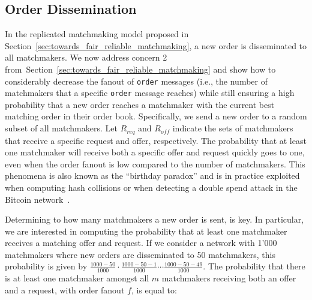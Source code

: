 
\subsection{Order Dissemination}
\label{sec:order_dissemination}
In the replicated matchmaking model proposed in Section~\ref{sec:towards_fair_reliable_matchmaking}, a new order is disseminated to all matchmakers.
We now address concern 2 from~Section~\ref{sec:towards_fair_reliable_matchmaking} and show how to considerably decrease the fanout of \texttt{order} messages (i.e., the number of matchmakers that a specific \texttt{order} message reaches) while still ensuring a high probability that a new order reaches a matchmaker with the current best matching order in their order book.
Specifically, we send a new order to a random subset of all matchmakers.
Let $ R_{req} $ and $ R_{off} $ indicate the sets of matchmakers that receive a specific request and offer, respectively.
The probability that at least one matchmaker will receive both a specific offer and request quickly goes to one, even when the order fanout is low compared to the number of matchmakers.
This phenomena is also known as the \enquote{birthday paradox} and is in practice exploited when computing hash collisions or when detecting a double spend attack in the Bitcoin network~\cite{schreiber2020k}.

Determining to how many matchmakers a new order is sent, is key.
In particular, we are interested in computing the probability that at least one matchmaker receives a matching offer and request.
If we consider a network with 1'000 matchmakers where new orders are disseminated to 50 matchmakers, this probability is given by $ \frac{1000-50}{1000} \cdot \frac{1000-50-1}{1000} \cdots \frac{1000-50-49}{1000} $.
The probability that there is at least one matchmaker amongst all $ m $ matchmakers receiving both an offer and a request, with order fanout $ f $, is equal to:

